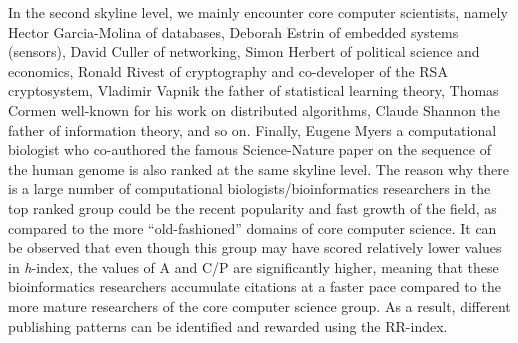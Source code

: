 In the second skyline level, we mainly encounter core computer
scientists, namely Hector Garcia-Molina of databases, Deborah Estrin of
embedded systems (sensors), David Culler of networking, Simon Herbert of
political science and economics, Ronald Rivest of crypto­graphy and
co-developer of the RSA cryptosystem, Vladimir Vapnik the father of
statistical learning theory, Thomas Cormen well-known for his work on
distributed algorithms, Claude Shannon the father of information theory,
and so on. Finally, Eugene Myers a computational biologist who
co-authored the famous Science-Nature paper on the sequence of the human
genome is also ranked at the same skyline level. The reason why there is
a large number of computational biologists/bioinformatics researchers in
the top ranked group could be the recent popularity and fast growth of
the field, as compared to the more ``old-fashioned'' domains of core
computer science. It can be observed that even though this group may
have scored relatively lower values in \emph{h}-index, the values of A
and C/P are significantly higher, meaning that these bioinformatics
researchers accumulate citations at a faster pace compared to the more
mature researchers of the core computer science group. As a result,
different publishing patterns can be identified and rewarded using the
RR-index.